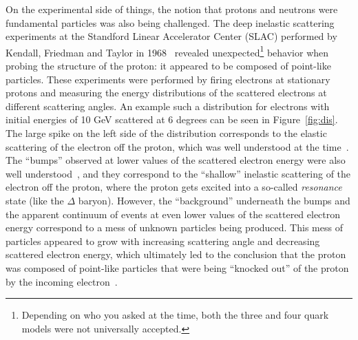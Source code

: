 On the experimental side of things, the notion that protons and neutrons were fundamental particles was also being challenged. The deep inelastic scattering experiments at the Standford Linear Accelerator Center (SLAC) performed by Kendall, Friedman and Taylor in 1968~\cite{Kendall, Friedman, Taylor} revealed unexpected\footnote{Depending on who you asked at the time, both the three and four quark models were not universally accepted.} behavior when probing the structure of the proton: it appeared to be composed of point-like particles. These experiments were performed by firing electrons at stationary protons and measuring the energy distributions of the scattered electrons at different scattering angles. An example such a distribution for electrons with initial energies of 10 GeV scattered at 6 degrees can be seen in Figure~\ref{fig:dis}. The large spike on the left side of the distribution corresponds to the elastic scattering of the electron off the proton, which was well understood at the time~\cite{ElasticScattering}. The ``bumps'' observed at lower values of the scattered electron energy were also well understood~\cite{Resonances}, and they correspond to the ``shallow'' inelastic scattering of the electron off the proton, where the proton gets excited into a so-called \textit{resonance} state (like the $\Delta$ baryon). However, the ``background'' underneath the bumps and the apparent continuum of events at even lower values of the scattered electron energy correspond to a mess of unknown particles being produced. This mess of particles appeared to grow with increasing scattering angle and decreasing scattered electron energy, which ultimately led to the conclusion that the proton was composed of point-like particles that were being ``knocked out'' of the proton by the incoming electron~\cite{Kendall, BjorkenScaling}.

